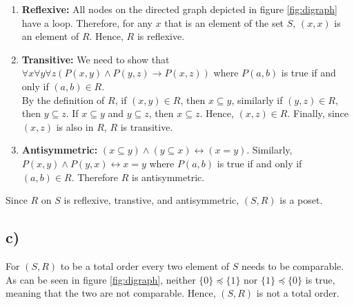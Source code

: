 \documentclass[11pt]{article}
\begin{document}
\begin{enumerate}
    \item{\textbf{Reflexive:}} All nodes on the directed graph depicted in figure \ref{fig:digraph} have a loop. Therefore, for any $x$ that is an element of the set $S$, $(x,x)$ is an element of $R$. Hence, $R$ is reflexive.
    \item{\textbf{Transitive:}} We need to show that $\forall x\forall y\forall z ( P(x,y) \land P(y,z) \rightarrow P(x,z))$ where $P(a,b)$ is true if and only if $(a,b) \in R$.\\
        By the definition of $R$, if $(x,y) \in R$, then $x \subseteq y$, similarly if $(y,z) \in R$, then $y \subseteq z$. If $x \subseteq y$ and $y \subseteq z$, then $x \subseteq z$. Hence, $(x,z) \in R$. Finally, since $(x,z)$ is also in $R$, $R$ is transitive.
    \item{\textbf{Antisymmetric:}} $(x \subseteq y) \land (y \subseteq x) \leftrightarrow (x = y)$. Similarly, $P(x,y) \land P(y,x) \leftrightarrow x = y$ where $P(a,b)$ is true if and only if $(a,b) \in R$. Therefore $R$ is antisymmetric.
\end{enumerate}
Since $R$ on $S$ is reflexive, transtive, and antisymmetric, $(S,R)$ is a poset.

\subsection*{c)}
For $(S,R)$ to be a total order every two element of $S$ needs to be comparable. As can be seen in figure \ref{fig:digraph}, neither $\{0\} \preceq \{1\}$ nor $\{1\} \preceq \{0\}$ is true, meaning that the two are not comparable. Hence, $(S,R)$ is not a total order.
\end{document}
